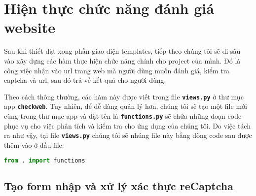 \section{Hiện thực chức năng đánh giá website}
Sau khi thiết đặt xong phần giao diện templates, tiếp theo chúng tôi sẽ đi sâu vào xây dựng các hàm thực hiện chức năng chính cho project của mình. Đó là công việc nhận vào url trang web mà người dùng muốn đánh giá, kiểm tra captcha và url, sau đó trả về kết quả cho người dùng.
\par
Theo cách thông thường, các hàm này được viết trong file \textbf{\texttt{views.py}} ở thư mục app \textbf{\texttt{checkweb}}. Tuy nhiên, để dễ dàng quản lý hơn, chúng tôi sẽ tạo một file mới cùng trong thư mục app và đặt tên là \textbf{\texttt{functions.py}} sẽ chứa những đoạn code phục vụ cho việc phân tích và kiểm tra cho ứng dụng của chúng tôi. Do việc tách ra như vậy, tại file \textbf{\texttt{views.py}} chúng tôi sẽ nhúng file này bằng dòng code sau được thêm vào ở đầu file:
\begin{lstlisting}[language=Python]
from . import functions
\end{lstlisting}
\par
\subsection{Tạo form nhập và xử lý xác thực reCaptcha}
